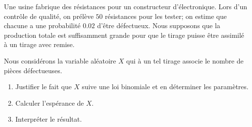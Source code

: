 
\begin{exercice}\label{exoPremiere-0093}

    Une usine fabrique des résistances pour un constructeur d'électronique. Lors d'un contrôle de qualité, on prélève \( 50\) résistances pour les tester; on estime que chacune a une probabilité \( 0.02\) d'être défectueux. Nous supposons que la production totale est suffisamment grande pour que le tirage puisse être assimilé à un tirage avec remise.

    Nous considérons la variable aléatoire \( X\) qui à un tel tirage associe le nombre de pièces défectueuses.

    \begin{enumerate}
        \item
            Justifier le fait que \( X\) suive une loi binomiale et en déterminer les paramètres.
        \item
            Calculer l'espérance de \( X\).
        \item
            Interpréter le résultat.
    \end{enumerate}

\end{exercice}
